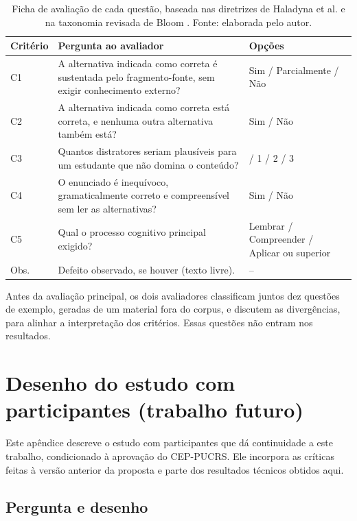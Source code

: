 \documentclass[portuguese,oneside]{tcc}
\begin{document}
\begin{table}[htbp]
\centering
\caption{Ficha de avaliação de cada questão, baseada nas diretrizes de Haladyna et al. e na taxonomia revisada de Bloom \cite{AK01}. Fonte: elaborada pelo autor.}
\label{tab:rubrica}
\small
\begin{tabularx}{\textwidth}{l >{\raggedright\arraybackslash}X >{\raggedright\arraybackslash}p{3.8cm}}
\toprule
Critério & Pergunta ao avaliador & Opções \\
\midrule
C1 & A alternativa indicada como correta é sustentada pelo fragmento-fonte, sem exigir conhecimento externo? & Sim / Parcialmente / Não \\
C2 & A alternativa indicada como correta está correta, e nenhuma outra alternativa também está? & Sim / Não \\
C3 & Quantos distratores seriam plausíveis para um estudante que não domina o conteúdo? & 0 / 1 / 2 / 3 \\
C4 & O enunciado é inequívoco, gramaticalmente correto e compreensível sem ler as alternativas? & Sim / Não \\
C5 & Qual o processo cognitivo principal exigido? & Lembrar / Compreender / Aplicar ou superior \\
Obs. & Defeito observado, se houver (texto livre). & -- \\
\bottomrule
\end{tabularx}
\end{table}

Antes da avaliação principal, os dois avaliadores classificam juntos dez questões de exemplo, geradas de um material fora do corpus, e discutem as divergências, para alinhar a interpretação dos critérios. Essas questões não entram nos resultados.

\chapter{\label{ap:usuarios}Desenho do estudo com participantes (trabalho futuro)}

Este apêndice descreve o estudo com participantes que dá continuidade a este trabalho, condicionado à aprovação do CEP-PUCRS. Ele incorpora as críticas feitas à versão anterior da proposta e parte dos resultados técnicos obtidos aqui.

\section{Pergunta e desenho}
\end{document}
